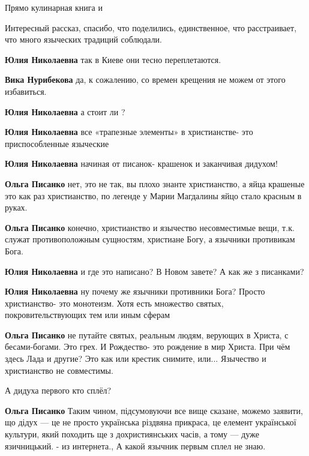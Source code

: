 \begin{itemize}
Прямо кулинарная книга и

Интересный рассказ, спасибо, что поделились, единственное, что расстраивает,
что много языческих традиций соблюдали.

\begin{itemize} %
\textbf{Юлия Николаевна} так в Киеве они тесно переплетаются.

\begin{itemize} %
\textbf{Вика Нурибекова} да, к сожалению, со времен крещения не можем от этого избавиться.

\textbf{Юлия Николаевна} а стоит ли ?

\textbf{Юлия Николаевна} все «трапезные элементы» в христианстве- это приспособленные языческие

\textbf{Юлия Николаевна} начиная от писанок- крашенок и заканчивая дидухом!

\textbf{Ольга Писанко} нет, это не так, вы плохо знанте христианство, а яйца крашеные это как раз христианство, по легенде у Марии Магдалины яйцо стало красным в руках.

\textbf{Ольга Писанко} конечно, христианство и язычество несовместимые вещи, т.к. служат противоположным сущностям, христиане Богу, а язычники противикам Бога.

\textbf{Юлия Николаевна} и где это написано? В Новом завете? А как же з писанками?

\textbf{Юлия Николаевна} ну почему же язычники противники Бога? Просто христианство- это монотеизм. Хотя есть множество святых, покровительствующих тем или иным сферам

\textbf{Ольга Писанко} не путайте святых, реальным людям, верующих в Христа, с бесами-богами. Это грех. И Рождество- это рождение в мир Христа. При чём здесь Лада и другие? Это как или крестик снимите, или... Язычество и христианство не совместимы.
\end{itemize} %

А дидуха первого кто сплёл?

\begin{itemize} %
\textbf{Ольга Писанко} Таким чином, підсумовуючи все вище сказане, можемо заявити, що дідух — це не просто українська різдвяна прикраса, це елемент української культури, який походить ще з дохристиянських часів, а тому — дуже язичницький. - из интернета., А какой язычник первым сплел не знаю.


\end{itemize}
\end{itemize}
\end{itemize}
